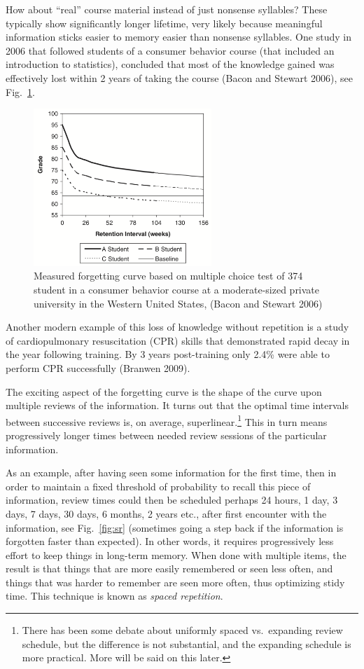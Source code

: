 How about ``real'' course material instead of just nonsense syllables?
These typically show significantly longer lifetime, very likely because
meaningful information sticks easier to memory easier than nonsense
syllables. One study in 2006 that followed students of a consumer
behavior course (that included an introduction to statistics), concluded
that most of the knowledge gained was effectively lost within 2 years of
taking the course (Bacon and Stewart 2006), see
Fig.~\ref{fig:course-fcurve}.

\begin{figure}
\centering
\includegraphics[width=0.60000\textwidth]{assets/forgetting-curve2.png}
\caption{Measured forgetting curve based on multiple choice test of 374
student in a consumer behavior course at a moderate-sized private
university in the Western United States, (Bacon and Stewart
2006)}\label{fig:course-fcurve}
\end{figure}

Another modern example of this loss of knowledge without repetition is a
study of cardiopulmonary resuscitation (CPR) skills that demonstrated
rapid decay in the year following training. By 3 years post-training
only 2.4\% were able to perform CPR successfully (Branwen 2009).

The exciting aspect of the forgetting curve is the shape of the curve
upon multiple reviews of the information. It turns out that the optimal
time intervals between successive reviews is, on average,
superlinear.\footnote{There has been some debate about uniformly spaced
  vs.~expanding review schedule, but the difference is not substantial,
  and the expanding schedule is more practical. More will be said on
  this later.} This in turn means progressively longer times between
needed review sessions of the particular information.

As an example, after having seen some information for the first time,
then in order to maintain a fixed threshold of probability to recall
this piece of information, review times could then be scheduled perhaps
24 hours, 1 day, 3 days, 7 days, 30 days, 6 months, 2 years etc., after
first encounter with the information, see Fig.~\ref{fig:sr} (sometimes
going a step back if the information is forgotten faster than expected).
In other words, it requires progressively less effort to keep things in
long-term memory. When done with multiple items, the result is that
things that are more easily remembered or seen less often, and things
that was harder to remember are seen more often, thus optimizing stidy
time. This technique is known as \emph{spaced repetition}.

